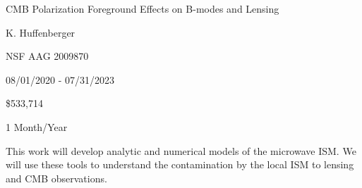 
 CMB Polarization Foreground Effects on B-modes and Lensing

 K. Huffenberger

 NSF AAG 2009870

 08/01/2020 - 07/31/2023

 \$533,714

 1 Month/Year

This work will develop analytic and numerical models of the microwave ISM. We
will use these tools to understand the contamination by the local ISM to lensing
and CMB observations.
